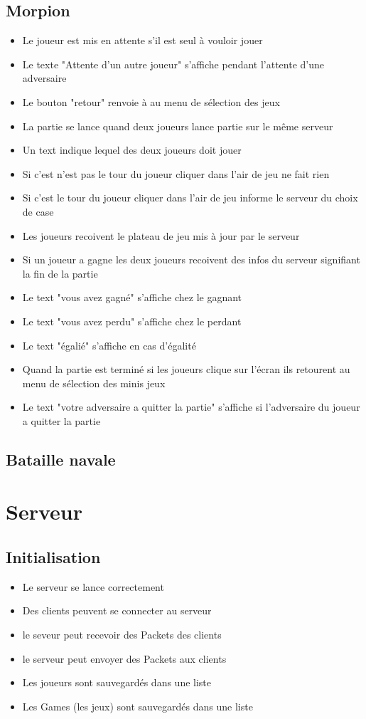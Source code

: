 \documentclass{report}
\begin{document}
\subsection{Morpion}
\begin{itemize}
  \item Le joueur est mis en attente s'il est seul à vouloir jouer
  \item Le texte "Attente d'un autre joueur" s'affiche pendant l'attente d'une adversaire
  \item Le bouton "retour" renvoie à au menu de sélection des jeux
  \item La partie se lance quand deux joueurs lance partie sur le même serveur
  \item Un text indique lequel des deux joueurs doit jouer
  \item Si c'est n'est pas le tour du joueur cliquer dans l'air de jeu ne fait rien
  \item Si c'est le tour du joueur cliquer dans l'air de jeu informe le serveur du choix de case
  \item Les joueurs recoivent le plateau de jeu mis à jour par le serveur
  \item Si un joueur a gagne les deux joueurs recoivent des infos du serveur signifiant la fin de la partie
  \item Le text "vous avez gagné" s'affiche chez le gagnant
  \item Le text "vous avez perdu" s'affiche chez le perdant
  \item Le text "égalié" s'affiche en cas d'égalité
  \item Quand la partie est terminé si les joueurs clique sur l'écran ils retourent au menu de sélection des minis jeux
  \item Le text "votre adversaire a quitter la partie" s'affiche si l'adversaire du joueur a quitter la partie
\end{itemize}

\subsection{Bataille navale}


\section{Serveur}

\subsection{Initialisation}
\begin{itemize}
  \item Le serveur se lance correctement
  \item Des clients peuvent se connecter au serveur
  \item le seveur peut recevoir des Packets des clients
  \item le serveur peut envoyer des Packets aux clients
  \item Les joueurs sont sauvegardés dans une liste
  \item Les Games (les jeux) sont sauvegardés dans une liste
\end{itemize}
\end{document}
